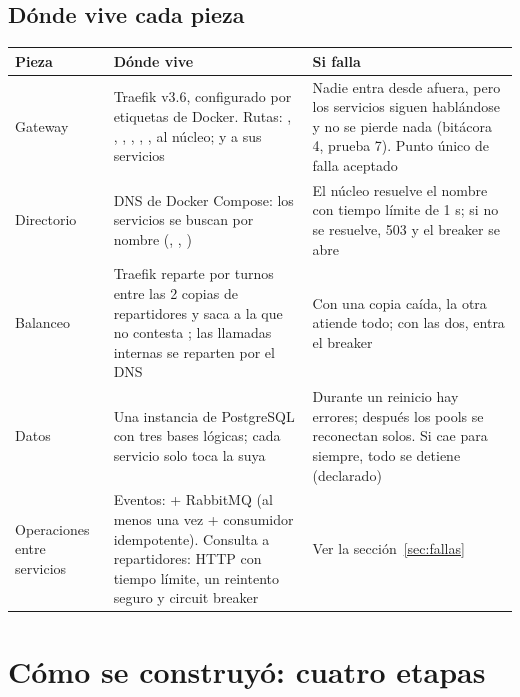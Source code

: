 \documentclass[11pt]{article}
\begin{document}
\subsection{Dónde vive cada pieza}
\begin{tabularx}{\linewidth}{@{}P{3cm} Y Y@{}}
\toprule
\textsf{\textbf{Pieza}} & \textsf{\textbf{Dónde vive}} & \textsf{\textbf{Si falla}} \\
\midrule
Gateway & Traefik v3.6, configurado por etiquetas de Docker. Rutas: , , , , , ,  al núcleo;  y  a sus servicios & Nadie entra desde afuera, pero los servicios siguen hablándose y no se pierde nada (bitácora 4, prueba 7). Punto único de falla aceptado \\
Directorio & DNS de Docker Compose: los servicios se buscan por nombre (, , ) & El núcleo resuelve el nombre con tiempo límite de 1 s; si no se resuelve, 503 y el breaker se abre \\
Balanceo & Traefik reparte por turnos entre las 2 copias de repartidores y saca a la que no contesta ; las llamadas internas se reparten por el DNS & Con una copia caída, la otra atiende todo; con las dos, entra el breaker \\
Datos & Una instancia de PostgreSQL con tres bases lógicas; cada servicio solo toca la suya & Durante un reinicio hay errores; después los pools se reconectan solos. Si cae para siempre, todo se detiene (declarado) \\
Operaciones entre servicios & Eventos:  + RabbitMQ (al menos una vez + consumidor idempotente). Consulta a repartidores: HTTP con tiempo límite, un reintento seguro y circuit breaker & Ver la sección~\ref{sec:fallas} \\
\bottomrule
\end{tabularx}

\section{Cómo se construyó: cuatro etapas}
\end{document}
